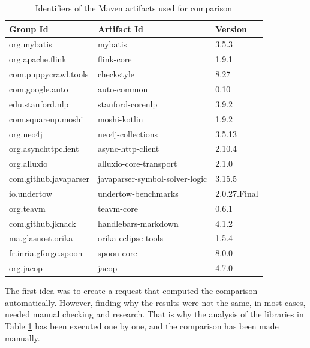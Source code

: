 \begin{table}[ht!]
    \begin{center}
    \begin{tabular}{|l|l|l|}
    \hline
    Group Id              & Artifact Id                     & Version       \\
    \hline
    org.mybatis           &	mybatis	                        & 3.5.3         \\
    org.apache.flink      & flink-core                      & 1.9.1         \\
    com.puppycrawl.tools  & checkstyle                      & 8.27          \\
    com.google.auto       & auto-common                     & 0.10          \\
    edu.stanford.nlp      & stanford-corenlp                & 3.9.2         \\
    com.squareup.moshi    & moshi-kotlin                    & 1.9.2         \\
    org.neo4j             & neo4j-collections               & 3.5.13        \\
    org.asynchttpclient   & async-http-client               & 2.10.4        \\
    org.alluxio           & alluxio-core-transport          & 2.1.0         \\
    com.github.javaparser & javaparser-symbol-solver-logic  & 3.15.5        \\
    io.undertow           & undertow-benchmarks             & 2.0.27.Final  \\
    org.teavm             & teavm-core                      & 0.6.1         \\
    com.github.jknack     & handlebars-markdown             & 4.1.2         \\
    ma.glasnost.orika     & orika-eclipse-tools             & 1.5.4         \\
    fr.inria.gforge.spoon & spoon-core                      & 8.0.0         \\
    org.jacop             & jacop                           & 4.7.0         \\
    \hline
    \end{tabular}
    \end{center}
    \caption{Identifiers of the Maven artifacts used for comparison}
    \label{table:comparison-artifacts}
\end{table}

The first idea was to create a request that computed the comparison automatically. However, finding why the results were not the same, in most cases, needed manual checking and research. That is why the analysis of the libraries in Table \ref{table:comparison-artifacts} has been executed one by one, and the comparison has been made manually.

